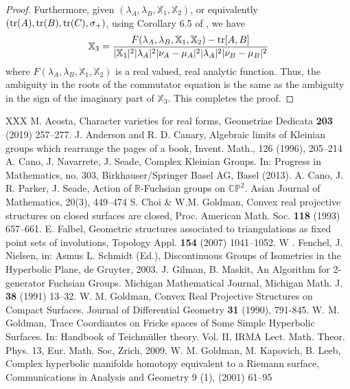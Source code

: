 \documentclass[11pt]{amsart}
\numberwithin{equation}{section}
\begin{document}
\begin{proof}
Furthermore, given $(\lambda_A,\lambda_B,{\mathbb X}_1,{\mathbb X}_2)$, or equivalently
$({\rm tr}(A),{\rm tr}(B),{\rm tr}(C),\sigma_+)$, using Corollary 6.5 of \cite{PP}, we have
$$
{\mathbb X}_3 = \frac{F(\lambda_A,\lambda_B,{\mathbb X}_1,{\mathbb X}_2)-{\rm tr}[A,B]}
{|{\mathbb X}_1|^2|\lambda_A|^2|\nu_A-\mu_A|^2|\lambda_A|^2|\nu_B-\mu_B|^2}
$$
where $F(\lambda_A,\lambda_B,{\mathbb X}_1,{\mathbb X}_2)$ is a real valued, real analytic function.
Thus, the ambiguity in the roots of the commutator equation is the same as the
ambiguity in the sign of the imaginary part of ${\mathbb X}_3$. This completes the proof.
\end{proof}

\medskip



\begin{thebibliography}{XXX}
    M. Acosta, Character varieties for real forms, Geometriae Dedicata {\bf 203} (2019) 257--277.
     J. Anderson and R. D. Canary, Algebraic limits of Kleinian groups which rearrange the pages of a book, Invent. Math., 126 (1996), 205--214
     A. Cano, J. Navarrete, J. Seade, Complex Kleinian Groups. In: Progress in Mathematics, no. 303, Birkhauser/Springer Basel AG, Basel (2013).
     A. Cano, J. R. Parker, J. Seade, Action of ${\mathbb R}$-Fuchsian groups on ${\mathbb C}{\mathbb P}^2$. Asian Journal of Mathematics, 20(3), 449--474
     S. Choi \& W.M. Goldman, Convex real projective structures on closed surfaces are closed, Proc. American Math. Soc. {\bf 118} (1993) 657--661.
     E. Falbel, Geometric structures associated to triangulations as fixed point sets of involutions, Topology Appl. {\bf 154} (2007) 1041--1052.
	 W . Fenchel, J. Nielsen, in: Asmus L. Schmidt (Ed.), Discontinuous Groups of Isometries in the Hyperbolic Plane,
	de Gruyter, 2003.
	 J. Gilman, B. Maskit, An Algorithm for 2-generator Fuchsian Groups. Michigan Mathematical Journal, Michigan Math. J. {\bf 38} (1991) 13--32.
	 W. M. Goldman, Convex Real Projective Structures on Compact Surfaces. Journal of Differential Geometry {\bf 31} (1990), 791-845.
	 W. M. Goldman, Trace Coordiantes on Fricke spaces of Some Simple Hyperbolic Surfaces. In: Handbook of Teichm\"uller theory. 
	Vol. II, IRMA  Lect. Math. Theor. Phys. 13, Eur. Math. Soc, Zrich, 2009.
	 W. M. Goldman, M. Kapovich, B. Leeb, Complex hyperbolic manifolds homotopy equivalent to a Riemann surface, Communications in Analysis and Geometry 9 (1), (2001) 61--95


\end{thebibliography}
\end{document}
